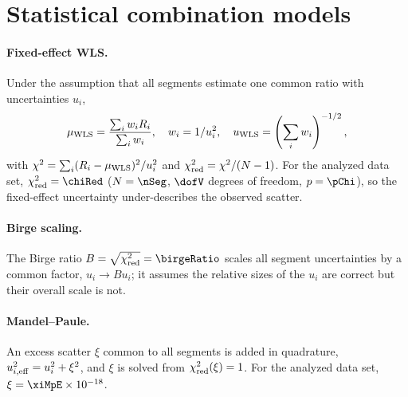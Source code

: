 \begin{table}[t]
  \centering
  \caption{Per-segment data of the 16 segments analyzed in this work. Ratio
  deviations $y_i = R_i/R_1 - 1$ are relative to the first segment;
  $u(y_i)$ is the statistical uncertainty of the segment ratio;
  ``Fit'' is \emph{est.} for segments whose stability fit lies in the
  white-frequency-noise band and \emph{lim.} for model-limited fits.}
  \label{tab:segments}
  
\end{table}

\section{Statistical combination models}
\label{app:stats}

\paragraph{Fixed-effect WLS.} Under the assumption that all segments
estimate one common ratio with uncertainties $u_i$,
\[
  \mu_{\rm WLS} = \frac{\sum_i w_i R_i}{\sum_i w_i}, \quad
  w_i = 1/u_i^2, \quad
  u_{\rm WLS} = \left(\sum_i w_i\right)^{-1/2},
\]
with $\chi^2 = \sum_i (R_i - \mu_{\rm WLS})^2 / u_i^2$ and
$\chi^2_{\rm red} = \chi^2/(N-1)$. For the analyzed data set,
$\chi^2_{\rm red} = \chiRed$ ($N = \nSeg$,
$\dofV$ degrees of freedom, $p = \pChi$), so the fixed-effect
uncertainty under-describes the observed scatter.

\paragraph{Birge scaling.} The Birge ratio
$B = \sqrt{\chi^2_{\rm red}} = \birgeRatio$ scales all segment
uncertainties by a common factor, $u_i \to B u_i$; it assumes the
relative sizes of the $u_i$ are correct but their overall scale is
not.

\paragraph{Mandel--Paule.} An excess scatter $\xi$ common to all
segments is added in quadrature, $u_{i,\rm eff}^2 = u_i^2 + \xi^2$,
and $\xi$ is solved from $\chi^2_{\rm red}(\xi) = 1$. For the analyzed
data set, $\xi = \xiMpE \times 10^{-18}$.

